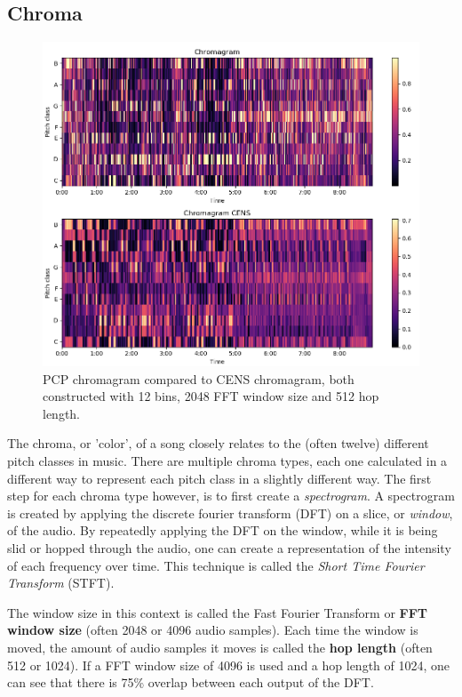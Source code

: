 \subsection{Chroma}
\begin{figure}[t]
    \centering
    \includegraphics[width=\textwidth]{images/cqt_cens}
    \caption{PCP chromagram compared to CENS chromagram, both constructed with 12 bins, 2048 FFT window size and 512 hop length.}
    \label{fig:pcp_cens}
\end{figure}
The chroma, or 'color', of a song closely relates to the (often twelve) different pitch classes in music. There are multiple chroma types, each one calculated in a different way to represent each pitch class in a slightly different way. The first step for each chroma type however, is to first create a \textit{spectrogram}. A spectrogram is created by applying the discrete fourier transform (DFT) on a slice, or \textit{window}, of the audio. By repeatedly applying the DFT on the window, while it is being slid or hopped through the audio, one can create a representation of the intensity of each frequency over time. This technique is called the \textit{Short Time Fourier Transform} (STFT). 

The window size in this context is called the Fast Fourier Transform or \textbf{FFT window size} (often 2048 or 4096 audio samples). Each time the window is moved, the amount of audio samples it moves is called the \textbf{hop length} (often 512 or 1024). If a FFT window size of 4096 is used and a hop length of 1024, one can see that there is 75\% overlap between each output of the DFT.

